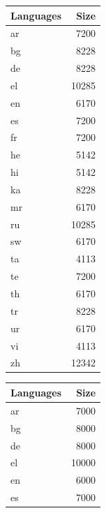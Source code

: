\begin{figure}[ht]
\begin{subtable}{0.32\textwidth}
    \end{subtable}
    \hfill
    \begin{subtable}{0.32\textwidth}
        \centering
        \begin{tabular}{lr}
            \toprule
            Languages & Size \\
            \midrule
            ar & 7200 \\
            bg & 8228 \\
            de & 8228 \\
            el & 10285 \\
            en & 6170 \\
            es & 7200 \\
            fr & 7200 \\
            he & 5142 \\
            hi & 5142 \\
            ka & 8228 \\
            mr & 6170 \\
            ru & 10285 \\
            sw & 6170 \\
            ta & 4113 \\
            te & 7200 \\
            th & 6170 \\
            tr & 8228 \\
            ur & 6170 \\
            vi & 4113 \\
            zh & 12342 \\
            \bottomrule
        \end{tabular}
        \caption{\citet{liang_xlm-v_2023}}
        \label{tab:liang_clusters_k20}
    \end{subtable}
    \hfill
    \begin{subtable}{0.32\textwidth}
        \centering
        \begin{tabular}{lr}
            \toprule
            Languages & Size \\
            \midrule
            ar & 7000 \\
            bg & 8000 \\
            de & 8000 \\
            el & 10000 \\
            en & 6000 \\
            es & 7000 \\

\end{tabular}
\end{subtable}
\end{figure}

